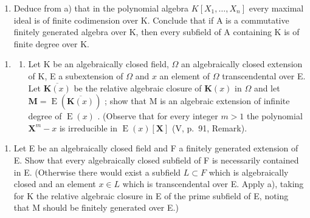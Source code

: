 \begin{enumerate}
\def\labelenumi{\alph{enumi})}
\setcounter{enumi}{1}
\tightlist
\item
  Deduce from a) that in the polynomial algebra \(K[X_{1}, \ldots, X_{n}]\) every maximal ideal is of finite codimension over K. Conclude that if A is a commutative finitely generated algebra over K, then every subfield of A containing K is of finite degree over K.
\end{enumerate}

\begin{enumerate}
\def\labelenumi{\arabic{enumi})}
\setcounter{enumi}{15}
\tightlist
\item
  \begin{enumerate}
  \def\labelenumii{\alph{enumii})}
  \tightlist
  \item
    Let K be an algebraically closed field, \(\Omega\) an algebraically closed extension of K, E a subextension of \(\Omega\) and \(x\) an element of \(\Omega\) transcendental over E. Let \(\overline{\mathbf{K}(x)}\) be the relative algebraic closure of \(\mathbf{K}(x)\) in \(\Omega\) and let \(\mathbf{M} = \operatorname{E}(\overline{\mathbf{K}(x)})\) ; show that M is an algebraic extension of infinite degree of \(\operatorname{E}(x)\) . (Observe that for every integer \(m > 1\) the polynomial \(\mathbf{X}^m - x\) is irreducible in \(\operatorname{E}(x)[\mathbf{X}]\) (V, p.~91, Remark).
  \end{enumerate}
\end{enumerate}

\begin{enumerate}
\def\labelenumi{\alph{enumi})}
\setcounter{enumi}{1}
\tightlist
\item
  Let E be an algebraically closed field and F a finitely generated extension of E. Show that every algebraically closed subfield of F is necessarily contained in E. (Otherwise there would exist a subfield \(L \subset F\) which is algebraically closed and an element \(x \in L\) which is transcendental over E. Apply a), taking for K the relative algebraic closure in E of the prime subfield of E, noting that M should be finitely generated over E.)
\end{enumerate}

